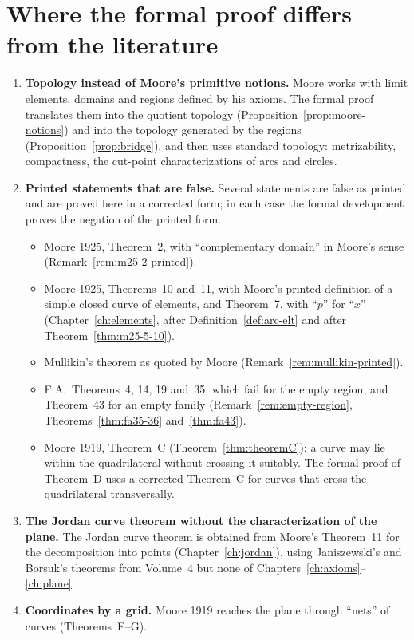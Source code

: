\section{Where the formal proof differs from the literature}\label{sec:intro-diff}

\begin{enumerate}
\item \textbf{Topology instead of Moore's primitive notions.} Moore works with limit elements, domains and
regions defined by his axioms. The formal proof translates them into the quotient topology
(Proposition~\ref{prop:moore-notions}) and into the topology generated by the regions
(Proposition~\ref{prop:bridge}), and then uses standard topology: metrizability, compactness, the
cut-point characterizations of arcs and circles.
\item \textbf{Printed statements that are false.} Several statements are false as printed and are proved here in
a corrected form; in each case the formal development proves the negation of the printed form.
\begin{itemize}
\item Moore 1925, Theorem~2, with ``complementary domain'' in Moore's sense (Remark~\ref{rem:m25-2-printed}).
\item Moore 1925, Theorems~10 and~11, with Moore's printed definition of a simple closed curve of
elements, and Theorem~7, with ``$p$'' for ``$x$'' (Chapter~\ref{ch:elements}, after
Definition~\ref{def:arc-elt} and after Theorem~\ref{thm:m25-5-10}).
\item Mullikin's theorem as quoted by Moore (Remark~\ref{rem:mullikin-printed}).
\item F.A.\ Theorems~4, 14, 19 and~35, which fail for the empty region, and Theorem~43 for an empty family
(Remark~\ref{rem:empty-region}, Theorems~\ref{thm:fa35-36} and~\ref{thm:fa43}).
\item Moore 1919, Theorem~C (Theorem~\ref{thm:theoremC}): a curve may lie within the quadrilateral without
crossing it suitably. The formal proof of Theorem~D uses a corrected Theorem~C for curves that cross the
quadrilateral transversally.
\end{itemize}
\item \textbf{The Jordan curve theorem without the characterization of the plane.} The Jordan curve theorem is
obtained from Moore's Theorem~11 for the decomposition into points (Chapter~\ref{ch:jordan}), using
Janiszewski's and Borsuk's theorems from Volume~4 but none of Chapters~\ref{ch:axioms}--\ref{ch:plane}.
\item \textbf{Coordinates by a grid.} Moore 1919 reaches the plane through ``nets'' of curves (Theorems~E--G).

\end{enumerate}
